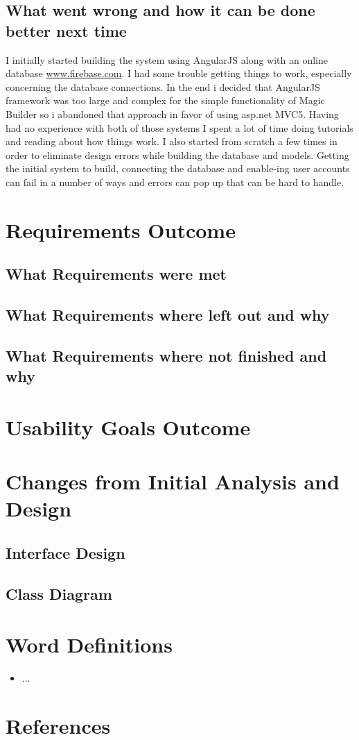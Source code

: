 \documentclass[paper=a4, fontsize=11pt]{scrartcl} %
\numberwithin{equation}{section} %
\numberwithin{figure}{section} %
\numberwithin{table}{section} %
\begin{document}
\subsection{What went wrong and how it can be done better next time
}
I initially started building the system using AngularJS along with an online database \href{http://www.firebase.com}{www.firebase.com}. I had some trouble getting things to work, especially concerning the database connections. In the end i decided that AngularJS framework was too large and complex for the simple functionality of Magic Builder so i abandoned that approach in favor of using asp.net MVC5. Having had no experience with both of those systems I spent a lot of time doing tutorials and reading about how things work. I also started from scratch a few times in order to eliminate design errors while building the database and models. Getting the initial system to build, connecting the database and enable-ing user accounts can fail in a number of ways and errors can pop up that can be hard to handle.

\section{Requirements Outcome}
\subsection{What Requirements were met}
\subsection{What Requirements where left out and why}
\subsection{What Requirements where not finished and why}

\section{Usability Goals Outcome}

\section{Changes from Initial Analysis and Design}
\subsection{Interface Design}
\subsection{Class Diagram}

\section{Word Definitions}
\begin{itemize}
\item ...
\end{itemize}

\clearpage

\section{References}
\end{document}
